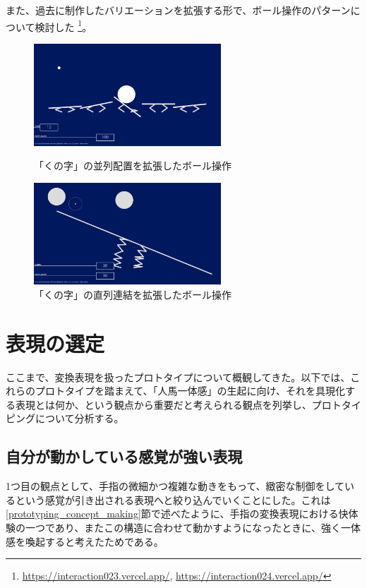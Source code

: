 また、過去に制作したバリエーションを拡張する形で、ボール操作のパターンについて検討した \footnote{\url{https://interaction023.vercel.app/}, \url{https://interaction024.vercel.app/}}。

\begin{figure}[htbp]
  \begin{minipage}[b]{0.5\linewidth}
    \centering
    \includegraphics[keepaspectratio, width=7cm]{img/ball_0.png}
    \caption{「くの字」の並列配置を拡張したボール操作}
    \label{fig:ball_0}
  \end{minipage}
  \begin{minipage}[b]{0.5\linewidth}
    \centering
    \includegraphics[keepaspectratio, width=7cm]{img/ball_1.png}
    \caption{「くの字」の直列連結を拡張したボール操作}
    \label{fig:ball_1}
  \end{minipage}
\end{figure}

\section{表現の選定}
ここまで、変換表現を扱ったプロトタイプについて概観してきた。以下では、これらのプロトタイプを踏まえて、「人馬一体感」の生起に向け、それを具現化する表現とは何か、という観点から重要だと考えられる観点を列挙し、プロトタイピングについて分析する。

\subsection{自分が動かしている感覚が強い表現}
1つ目の観点として、手指の微細かつ複雑な動きをもって、緻密な制御をしているという感覚が引き出される表現へと絞り込んでいくことにした。これは\ref{prototyping_concept_making}節で述べたように、手指の変換表現における快体験の一つであり、またこの構造に合わせて動かすようになったときに、強く一体感を喚起すると考えたためである。

